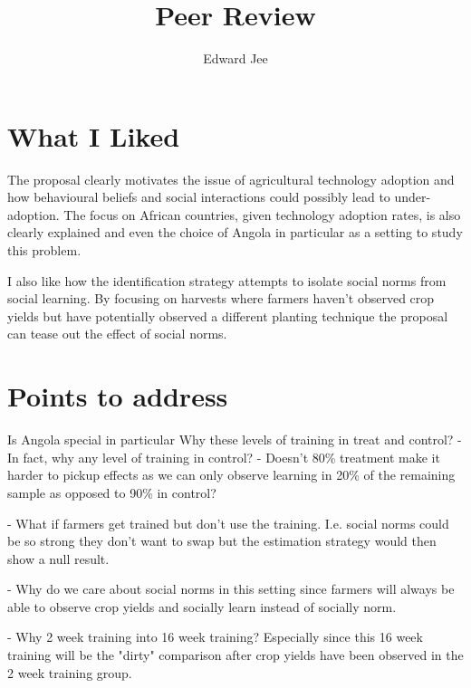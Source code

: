 \documentclass{article}
\title{Peer Review}
\author{Edward Jee}
\begin{document}
\maketitle



\section*{What I Liked}


The proposal clearly motivates the issue of agricultural technology adoption and 
how behavioural beliefs and social interactions could possibly lead to 
under-adoption. The focus on African countries, given technology adoption rates, 
is also clearly explained and even the choice of Angola in particular as a 
setting to study this problem.


I also like how the identification strategy attempts to isolate social norms 
from social learning. By focusing on harvests where farmers haven't observed 
crop yields but have potentially observed a different planting technique the 
proposal can tease out the effect of social norms. 

\section*{Points to address}


Is Angola special in particular
Why these levels of training in treat and control? 
- In fact, why any level of training in control?
- Doesn't 80\% treatment make it harder to pickup effects as we can only 
observe learning in 20\% of the remaining sample as opposed to 90\% in control?



- What if farmers get trained but don't use the training. I.e. social norms 
could be so strong they don't want to swap but the estimation strategy would then 
show a null result.

- Why do we care about social norms in this setting since farmers will always be 
able to observe crop yields and socially learn instead of socially norm. 





- Why 2 week training into 16 week training? Especially since this 16 week 
training will be the "dirty" comparison after crop yields have been observed in 
the 2 week training group.
    
\end{document}

